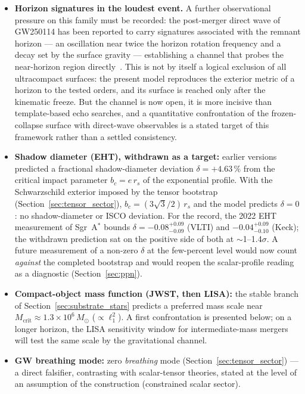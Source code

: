 \documentclass[11pt,a4paper]{article}
\theoremstyle{plain}
\theoremstyle{remark}
\begin{document}
\begin{itemize}
astrophysically aged progenitors are structurally silent and fresh-remnant echoes fall outside the quasi-periodic templates employed.
    \item \textbf{Horizon signatures in the loudest event.} A further observational pressure on this family must be recorded: the post-merger direct wave of GW250114 has been reported to carry signatures associated with the remnant horizon --- an oscillation near twice the horizon rotation frequency and a decay set by the surface gravity --- establishing a channel that probes the near-horizon region directly~\cite{lu2026}. This is not by itself a logical exclusion of all ultracompact surfaces: the present model reproduces the exterior metric of a horizon to the tested orders, and its surface is reached only after the kinematic freeze. But the channel is now open, it is more incisive than template-based echo searches, and a quantitative confrontation of the frozen-collapse surface with direct-wave observables is a stated target of this framework rather than a settled consistency.
    \item \textbf{Shadow diameter (EHT), withdrawn as a target:} earlier versions predicted a fractional shadow-diameter deviation $\delta = +4.63\,\%$ from the critical impact parameter $b_c = e\,r_s$ of the exponential profile. With the Schwarzschild exterior imposed by the tensor bootstrap (Section~\ref{sec:tensor_sector}), $b_c = (3\sqrt3/2)\,r_s$ and the model predicts $\delta = 0$: no shadow-diameter or ISCO deviation. For the record, the 2022 EHT measurement of Sgr~A$^*$ bounds $\delta = -0.08^{+0.09}_{-0.09}$ (VLTI) and $-0.04^{+0.09}_{-0.10}$ (Keck); the withdrawn prediction sat on the positive side of both at $\sim$1--1.4$\sigma$. A future measurement of a non-zero $\delta$ at the few-percent level would now count \emph{against} the completed bootstrap and would reopen the scalar-profile reading as a diagnostic (Section~\ref{sec:ppn}).
    \item \textbf{Compact-object mass function (JWST, then LISA):} the stable branch of Section~\ref{sec:substrate_stars} predicts a preferred mass scale near $M_{\text{crit}} \approx 1.3\times10^{6}\,M_\odot$ ($\propto \ell_1^2$). A first confrontation is presented below; on a longer horizon, the LISA sensitivity window for intermediate-mass mergers will test the same scale by the gravitational channel.
    \item \textbf{GW breathing mode:} zero \emph{breathing} mode (Section~\ref{sec:tensor_sector}) --- a direct falsifier, contrasting with scalar-tensor theories, stated at the level of an assumption of the construction (constrained scalar sector).
\end{itemize}
\end{document}

